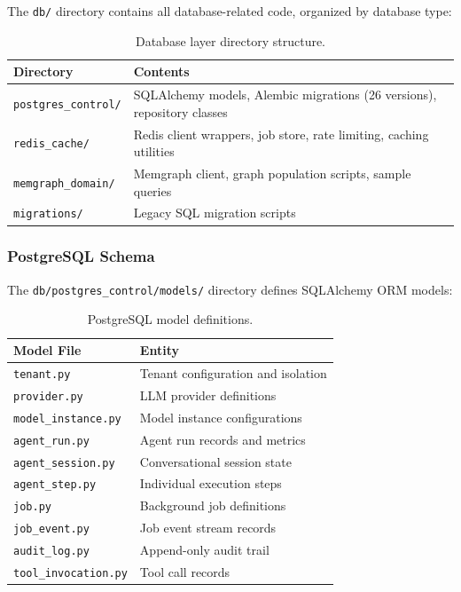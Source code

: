 The \texttt{db/} directory contains all database-related code, organized by database type:

\begin{table}[ht]
\centering
\caption{Database layer directory structure.}
\label{tab:db-structure}
\small
\begin{tabular}{lp{8cm}}
\hline
\textbf{Directory} & \textbf{Contents} \\
\hline
\texttt{postgres\_control/} & SQLAlchemy models, Alembic migrations (26 versions), repository classes \\
\texttt{redis\_cache/} & Redis client wrappers, job store, rate limiting, caching utilities \\
\texttt{memgraph\_domain/} & Memgraph client, graph population scripts, sample queries \\
\texttt{migrations/} & Legacy SQL migration scripts \\
\hline
\end{tabular}
\end{table}

\subsubsection{PostgreSQL Schema}

The \texttt{db/postgres\_control/models/} directory defines SQLAlchemy ORM models:

\begin{table}[ht]
\centering
\caption{PostgreSQL model definitions.}
\label{tab:postgres-models}
\small
\begin{tabular}{ll}
\hline
\textbf{Model File} & \textbf{Entity} \\
\hline
\texttt{tenant.py} & Tenant configuration and isolation \\
\texttt{provider.py} & LLM provider definitions \\
\texttt{model\_instance.py} & Model instance configurations \\
\texttt{agent\_run.py} & Agent run records and metrics \\
\texttt{agent\_session.py} & Conversational session state \\
\texttt{agent\_step.py} & Individual execution steps \\
\texttt{job.py} & Background job definitions \\
\texttt{job\_event.py} & Job event stream records \\
\texttt{audit\_log.py} & Append-only audit trail \\
\texttt{tool\_invocation.py} & Tool call records \\
\hline
\end{tabular}
\end{table}

